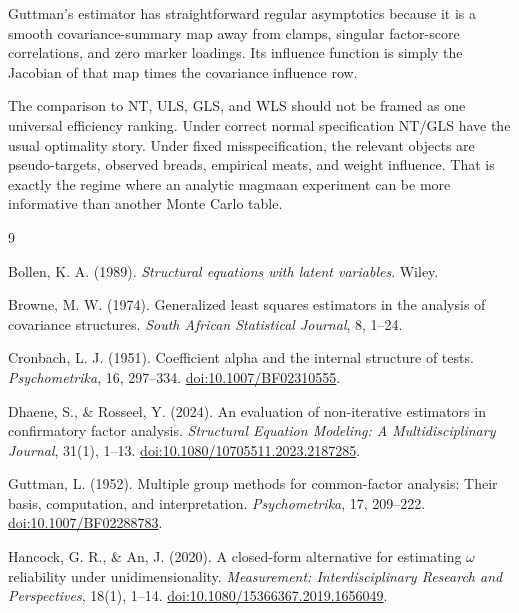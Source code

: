 \documentclass[11pt]{article}
\theoremstyle{plain}
\theoremstyle{remark}
\begin{document}
Guttman's estimator has straightforward regular asymptotics because it is a
smooth covariance-summary map away from clamps, singular factor-score
correlations, and zero marker loadings. Its influence function is simply the
Jacobian of that map times the covariance influence row.

The comparison to NT, ULS, GLS, and WLS should not be framed as one universal
efficiency ranking. Under correct normal specification NT/GLS have the usual
optimality story. Under fixed misspecification, the relevant objects are
pseudo-targets, observed breads, empirical meats, and weight influence. That is
exactly the regime where an analytic magmaan experiment can be more informative
than another Monte Carlo table.

\begin{thebibliography}{9}

Bollen, K. A. (1989).
\newblock \emph{Structural equations with latent variables}.
\newblock Wiley.

Browne, M. W. (1974).
\newblock Generalized least squares estimators in the analysis of covariance
structures.
\newblock \emph{South African Statistical Journal}, 8, 1--24.

Cronbach, L. J. (1951).
\newblock Coefficient alpha and the internal structure of tests.
\newblock \emph{Psychometrika}, 16, 297--334.
\newblock \href{https://doi.org/10.1007/BF02310555}
{doi:10.1007/BF02310555}.

Dhaene, S., \& Rosseel, Y. (2024).
\newblock An evaluation of non-iterative estimators in confirmatory factor
analysis.
\newblock \emph{Structural Equation Modeling: A Multidisciplinary Journal},
31(1), 1--13.
\newblock \href{https://doi.org/10.1080/10705511.2023.2187285}
{doi:10.1080/10705511.2023.2187285}.

Guttman, L. (1952).
\newblock Multiple group methods for common-factor analysis: Their basis,
computation, and interpretation.
\newblock \emph{Psychometrika}, 17, 209--222.
\newblock \href{https://doi.org/10.1007/BF02288783}
{doi:10.1007/BF02288783}.

Hancock, G. R., \& An, J. (2020).
\newblock A closed-form alternative for estimating \(\omega\) reliability under
unidimensionality.
\newblock \emph{Measurement: Interdisciplinary Research and Perspectives}, 18(1),
1--14.
\newblock \href{https://doi.org/10.1080/15366367.2019.1656049}
{doi:10.1080/15366367.2019.1656049}.


\end{thebibliography}
\end{document}
